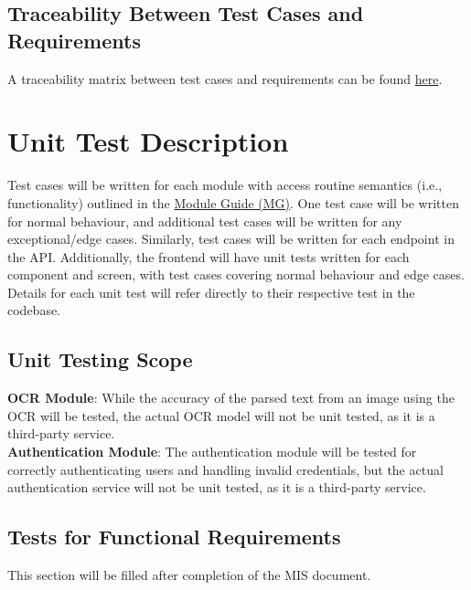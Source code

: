 \documentclass[12pt, titlepage]{article}
\begin{document}
\subsection{Traceability Between Test Cases and Requirements}

A traceability matrix between test cases and requirements can be found
\href{https://github.com/PlutosCapstone/Plutos/blob/main/docs/VnVPlan/traceability_tests_and_requirements.xlsx}{here}.

\newpage

\section{Unit Test Description}

Test cases will be written for each module with access routine semantics (i.e.,
functionality) outlined in the
\href{https://github.com/PlutosCapstone/Plutos/blob/main/docs/Design/SoftArchitecture/MG.pdf}{Module
Guide (MG)}. One test case will be written for normal behaviour, and additional
test cases will be written for any exceptional/edge cases. Similarly, test cases
will be written for each endpoint in the API. Additionally, the frontend will
have unit tests written for each component and screen, with test cases covering
normal behaviour and edge cases.\\
Details for each unit test will refer directly to their respective test in the
codebase.\\

\subsection{Unit Testing Scope}

\textbf{OCR Module}: While the accuracy of the parsed text from an image using
the OCR will be tested, the actual OCR model will not be unit tested, as it is a
third-party service. \\
\textbf{Authentication Module}: The authentication module will be tested for
correctly authenticating users and handling invalid credentials, but the actual 
authentication service will not be unit tested, as it is a third-party service.


\subsection{Tests for Functional Requirements}

This section will be filled after completion of the MIS document.
\end{document}
